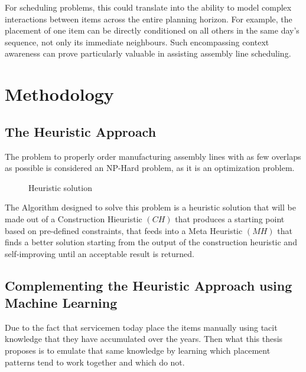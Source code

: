 \documentclass[12pt,a4paper]{report}
\begin{document}
For scheduling problems, this could translate into the ability to model complex interactions between items across the entire planning horizon. For example, the placement of one item can be directly conditioned on all others in the same day’s sequence, not only its immediate neighbours. Such encompassing context awareness can prove particularly valuable in assisting assembly line scheduling.


\chapter{Methodology}
\section{The Heuristic Approach}

The problem to properly order manufacturing assembly lines with as few overlaps as possible is considered an NP-Hard problem, as it is an optimization problem.

\begin{figure}[ht]
    \centering

    \caption{Heuristic solution}
    \label{fig:solution}
\end{figure}

The Algorithm designed to solve this problem is a heuristic solution that will be made out of a Construction Hieuristic $(C\!H)$ that produces a starting point based on pre-defined constraints, that feeds into a Meta Heuristic $(M\!H)$ that finds a better solution starting from the output of the construction heuristic and self-improving until an acceptable result is returned. 

\section{Complementing the Heuristic Approach using Machine Learning}
Due to the fact that servicemen today place the items manually using tacit knowledge that they have accumulated over the years. Then what this thesis proposes is to emulate that same knowledge by learning which placement patterns tend to work together and which do not.
\end{document}
